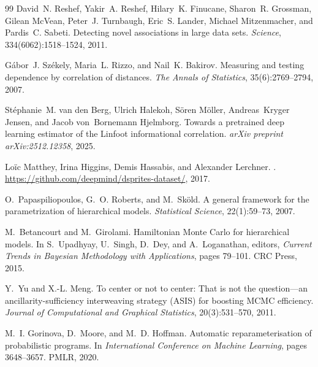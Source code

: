 \documentclass[10pt]{article} %
\theoremstyle{plain}
\theoremstyle{definition}
\begin{document}
\begin{thebibliography}{99}
David~N. Reshef, Yakir~A. Reshef, Hilary~K. Finucane, Sharon~R. Grossman, Gilean McVean, Peter~J. Turnbaugh, Eric~S. Lander, Michael Mitzenmacher, and Pardis~C. Sabeti.
\newblock Detecting novel associations in large data sets.
\newblock \emph{Science}, 334(6062):1518--1524, 2011.

G{\'a}bor~J. Sz{\'e}kely, Maria~L. Rizzo, and Nail~K. Bakirov.
\newblock Measuring and testing dependence by correlation of distances.
\newblock \emph{The Annals of Statistics}, 35(6):2769--2794, 2007.

St{\'e}phanie~M. van den Berg, Ulrich Halekoh, S{\"o}ren M{\"o}ller, Andreas~Kryger Jensen, and Jacob von~Bornemann Hjelmborg.
\newblock Towards a pretrained deep learning estimator of the {Linfoot} informational correlation.
\newblock \emph{arXiv preprint arXiv:2512.12358}, 2025.

Lo{\"i}c Matthey, Irina Higgins, Demis Hassabis, and Alexander Lerchner.
.
\newblock \url{https://github.com/deepmind/dsprites-dataset/}, 2017.

O.~Papaspiliopoulos, G.~O. Roberts, and M.~Sk\"{o}ld.
\newblock A general framework for the parametrization of hierarchical models.
\newblock \emph{Statistical Science}, 22(1):59--73, 2007.

M.~Betancourt and M.~Girolami.
\newblock Hamiltonian {M}onte {C}arlo for hierarchical models.
\newblock In S.~Upadhyay, U.~Singh, D.~Dey, and A.~Loganathan, editors, \emph{Current Trends in Bayesian Methodology with Applications}, pages 79--101. CRC Press, 2015.

Y.~Yu and X.-L. Meng.
\newblock To center or not to center: That is not the question---an ancillarity-sufficiency interweaving strategy ({ASIS}) for boosting {MCMC} efficiency.
\newblock \emph{Journal of Computational and Graphical Statistics}, 20(3):531--570, 2011.

M.~I. Gorinova, D.~Moore, and M.~D. Hoffman.
\newblock Automatic reparameterisation of probabilistic programs.
\newblock In \emph{International Conference on Machine Learning}, pages 3648--3657. PMLR, 2020.


\end{thebibliography}
\end{document}
